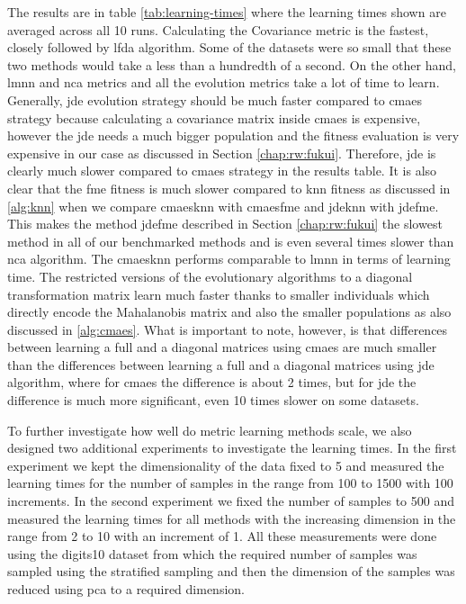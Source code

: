 \documentclass[12pt,a4paper]{report}
\begin{document}
The results are in table \ref{tab:learning-times} where the learning times shown are averaged across all 10 runs. Calculating the Covariance metric is the fastest, closely followed by \ac{lfda} algorithm. Some of the datasets were so small that these two methods would take a less than a hundredth of a second. On the other hand, \ac{lmnn} and \ac{nca} metrics and all the evolution metrics take a lot of time to learn. Generally, \ac{jde} evolution strategy should be much faster compared to \ac{cmaes} strategy because calculating a covariance matrix inside \ac{cmaes} is expensive, however the \ac{jde} needs a much bigger population and the fitness evaluation is very expensive in our case as discussed in Section \ref{chap:rw:fukui}. Therefore, \ac{jde} is clearly much slower compared to \ac{cmaes} strategy in the results table. It is also clear that the \ac{fme} fitness is much slower compared to \ac{knn} fitness as discussed in \ref{alg:knn} when we compare \ac{cmaesknn} with \ac{cmaesfme} and \ac{jdeknn} with \ac{jdefme}. This makes the method \ac{jdefme} described in Section \ref{chap:rw:fukui} the slowest method in all of our benchmarked methods and is even several times slower than \ac{nca} algorithm. The \ac{cmaesknn} performs comparable to \ac{lmnn} in terms of learning time. The restricted versions of the evolutionary algorithms to a diagonal transformation matrix learn much faster thanks to smaller individuals which directly encode the Mahalanobis matrix and also the smaller populations as also discussed in \ref{alg:cmaes}. What is important to note, however, is that differences between learning a full and a diagonal matrices using \ac{cmaes} are much smaller than the differences between learning a full and a diagonal matrices using \ac{jde} algorithm, where for \ac{cmaes} the difference is about 2 times, but for \ac{jde} the difference is much more significant, even 10 times slower on some datasets.



To further investigate how well do metric learning methods scale, we also designed two additional experiments to investigate the learning times. In the first experiment we kept the dimensionality of the data fixed to 5 and measured the learning times for the number of samples in the range from 100 to 1500 with 100 increments. In the second experiment we fixed the number of samples to 500 and measured the learning times for all methods with the increasing dimension in the range from 2 to 10 with an increment of 1. All these measurements were done using the digits10 dataset from which the required number of samples was sampled using the stratified sampling and then the dimension of the samples was reduced using \ac{pca} to a required dimension.
\end{document}

